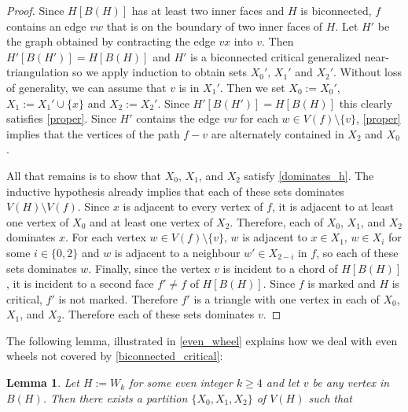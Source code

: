 \documentclass{article}
\newcommand{\pat}[1]{\textcolor{red}{PM: #1}}
\newtheorem{lem}{Lemma}
\theoremstyle{definition}
\begin{document}
\begin{proof}
  Since $H[B(H)]$ has at least two inner faces and $H$ is biconnected, $f$ contains an edge $vw$ that is on the boundary of two inner faces of $H$.  Let $H'$ be the graph obtained by contracting the edge $vx$ into $v$. Then $H'[B(H')]=H[B(H)]$ and $H'$ is a biconnected critical generalized near-triangulation so we apply induction to obtain sets $X_0'$, $X_1'$ and $X_2'$.  Without loss of generality, we can assume that $v$ is in $X_1'$.  Then we set $X_0:=X_0'$, $X_1:=X_1'\cup\{x\}$ and $X_2:=X_2'$. Since $H'[B(H')]=H[B(H)]$ this clearly satisfies \cref{proper}.  Since $H'$ contains the edge $vw$ for each $w\in V(f)\setminus\{v\}$, \cref{proper} implies that the vertices of the path $f-v$ are alternately contained in $X_2$ and $X_0$.

  All that remains is to show that $X_0$, $X_1$, and $X_2$ satisfy \cref{dominates_h}.  The inductive hypothesis already implies that each of these sets dominates $V(H)\setminus V(f)$.  Since $x$ is adjacent to every vertex of $f$, it is adjacent to at least one vertex of $X_0$ and at least one vertex of $X_2$.  Therefore, each of $X_0$, $X_1$, and $X_2$ dominates $x$.  For each vertex $w\in V(f)\setminus\{v\}$, $w$ is adjacent to $x\in X_1$, $w\in X_{i}$ for some $i\in\{0,2\}$ and $w$ is adjacent to a neighbour $w'\in X_{2-i}$ in $f$, so each of these sets dominates $w$.  Finally, since the vertex $v$ is incident to a chord of $H[B(H)]$, it is incident to a second face $f'\neq f$ of $H[B(H)]$.  Since $f$ is marked and $H$ is critical, $f'$ is not marked.  Therefore $f'$ is a triangle with one vertex in each of $X_0$, $X_1$, and $X_2$. Therefore each of these sets dominates $v$.
\end{proof}

The following lemma, illustrated in \cref{even_wheel}
 explains how we deal with even wheels not covered by \cref{biconnected_critical}:

\begin{lem}\label{wheelie}
  Let $H:=W_k$ for some even integer $k\ge 4$ and let $v$ be any vertex in $B(H)$.  Then there exists a partition $\{X_0,X_1,X_2\}$ of $V(H)$ such that
\end{lem}
\end{document}
